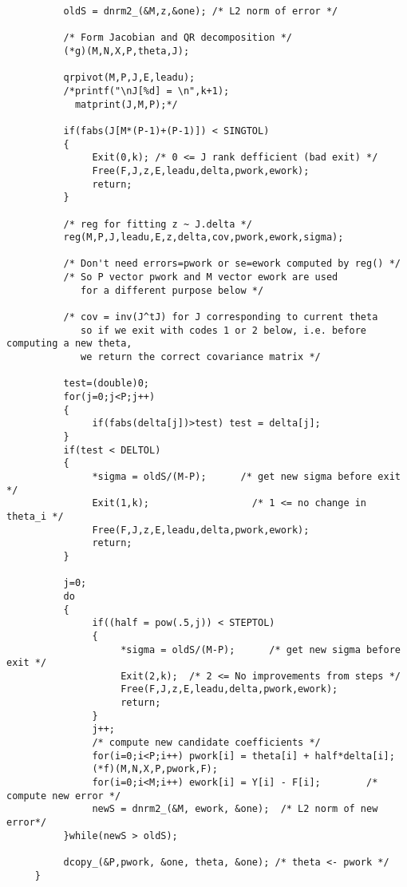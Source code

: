 \documentclass{article}
\begin{document}
{\begin{verbatim}
          oldS = dnrm2_(&M,z,&one); /* L2 norm of error */

          /* Form Jacobian and QR decomposition */
          (*g)(M,N,X,P,theta,J); 

          qrpivot(M,P,J,E,leadu); 
          /*printf("\nJ[%d] = \n",k+1);
            matprint(J,M,P);*/

          if(fabs(J[M*(P-1)+(P-1)]) < SINGTOL)
          {
               Exit(0,k); /* 0 <= J rank defficient (bad exit) */
               Free(F,J,z,E,leadu,delta,pwork,ework);
               return;
          }
          
          /* reg for fitting z ~ J.delta */
          reg(M,P,J,leadu,E,z,delta,cov,pwork,ework,sigma);

          /* Don't need errors=pwork or se=ework computed by reg() */
          /* So P vector pwork and M vector ework are used
             for a different purpose below */

          /* cov = inv(J^tJ) for J corresponding to current theta 
             so if we exit with codes 1 or 2 below, i.e. before computing a new theta,
             we return the correct covariance matrix */

          test=(double)0;
          for(j=0;j<P;j++) 
          {
               if(fabs(delta[j])>test) test = delta[j];
          }
          if(test < DELTOL)   
          {
               *sigma = oldS/(M-P);      /* get new sigma before exit */
               Exit(1,k);                  /* 1 <= no change in theta_i */
               Free(F,J,z,E,leadu,delta,pwork,ework);
               return;
          }

          j=0;
          do
          {
               if((half = pow(.5,j)) < STEPTOL)
               {
                    *sigma = oldS/(M-P);      /* get new sigma before exit */
                    Exit(2,k);  /* 2 <= No improvements from steps */
                    Free(F,J,z,E,leadu,delta,pwork,ework);
                    return;
               }
               j++;
               /* compute new candidate coefficients */
               for(i=0;i<P;i++) pwork[i] = theta[i] + half*delta[i]; 
               (*f)(M,N,X,P,pwork,F); 
               for(i=0;i<M;i++) ework[i] = Y[i] - F[i];        /* compute new error */
               newS = dnrm2_(&M, ework, &one);  /* L2 norm of new error*/         
          }while(newS > oldS);

          dcopy_(&P,pwork, &one, theta, &one); /* theta <- pwork */
     }


\end{verbatim}}
\end{document}
